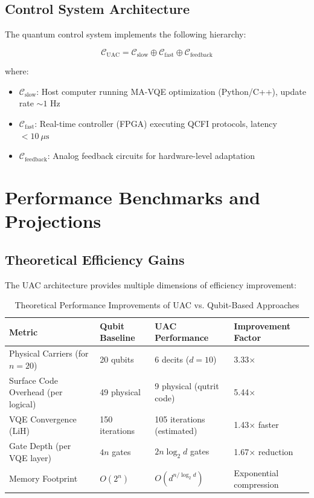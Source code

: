 \documentclass[12pt, a4paper]{article}
\begin{document}
\subsection{Control System Architecture}
The quantum control system implements the following hierarchy:

\begin{equation}
\mathcal{C}_{\text{UAC}} = \mathcal{C}_{\text{slow}} \oplus \mathcal{C}_{\text{fast}} \oplus \mathcal{C}_{\text{feedback}}
\end{equation}

where:
\begin{itemize}
    \item $\mathcal{C}_{\text{slow}}$: Host computer running MA-VQE optimization (Python/C++), update rate $\sim 1$ Hz
    \item $\mathcal{C}_{\text{fast}}$: Real-time controller (FPGA) executing QCFI protocols, latency $< 10\ \mu\text{s}$
    \item $\mathcal{C}_{\text{feedback}}$: Analog feedback circuits for hardware-level adaptation
\end{itemize}

\section{Performance Benchmarks and Projections}
\label{sec:performance}

\subsection{Theoretical Efficiency Gains}
The UAC architecture provides multiple dimensions of efficiency improvement:

\begin{table}[H]
\centering
\caption{Theoretical Performance Improvements of UAC vs. Qubit-Based Approaches}
\label{tab:performance}
\begin{tabular}{@{}llll@{}}
\toprule
\textbf{Metric} & \textbf{Qubit Baseline} & \textbf{UAC Performance} & \textbf{Improvement Factor} \\
\midrule
Physical Carriers (for $n=20$) & 20 qubits & 6 decits ($d=10$) & 3.33× \\
Surface Code Overhead (per logical) & 49 physical & 9 physical (qutrit code) & 5.44× \\
VQE Convergence (LiH) & 150 iterations & 105 iterations (estimated) & 1.43× faster \\
Gate Depth (per VQE layer) & $4n$ gates & $2n \log_2 d$ gates & 1.67× reduction \\
Memory Footprint & $O(2^n)$ & $O(d^{n/\log_2 d})$ & Exponential compression \\
\bottomrule
\end{tabular}
\end{table}
\end{document}

